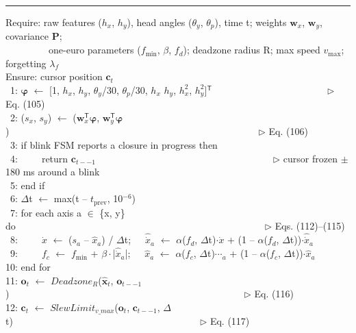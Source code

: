 \begin{algorithm}[htbp]
\caption{Gaze stabilisation and online recalibration (per frame)}
\label{alg:4}
\hrule\vspace{3pt}
{\ttfamily\scriptsize\raggedright
Require: raw features ($h_{x}$, $h_{y}$), head angles ($\theta_{y}$, $\theta_{p}$), time t; weights $\mathbf{w}_{x}$, $\mathbf{w}_{y}$, covariance $\mathbf{P}$; \\
~~~~~~~~~one-euro parameters ($f_{\mathrm{min}}$, $\beta$, $f_{d}$); deadzone radius R; max speed $v_{\mathrm{max}}$; forgetting $\lambda_{f}$ \\
Ensure: cursor position $\mathbf{c}_{t}$ \\
~1: $\boldsymbol{\varphi}$ $\leftarrow$ [1, $h_{x}$, $h_{y}$, $\theta_{y}$/30, $\theta_{p}$/30, $h_{x}$ $h_{y}$, $h_{x}^{2}$, $h_{y}^{2}$]$^{\mathsf{T}}$~~~~~~~~~~~~~~~~~~~~~~~~$\triangleright$ Eq. (105) \\
~2: ($s_{x}$, $s_{y}$) $\leftarrow$ ($\mathbf{w}_{x}^{\mathsf{T}}\boldsymbol{\varphi}$, $\mathbf{w}_{y}^{\mathsf{T}}\boldsymbol{\varphi}$)~~~~~~~~~~~~~~~~~~~~~~~~~~~~~~~~~~~~~~~~~~~~~~~~~~~~$\triangleright$ Eq. (106) \\
~3: if blink FSM reports a closure in progress then \\
~4:~~~~~return $\mathbf{c}_{t--1}$~~~~~~~~~~~~~~~~~~~~~~~~~~~~~~~~~~~~~$\triangleright$ cursor frozen $\pm$180 ms around a blink \\
~5: end if \\
~6: $\Delta$t $\leftarrow$ max(t -- $t_{\mathrm{prev}}$, 10$^{-6}$) \\
~7: for each axis a $\in$ \{x, y\} do~~~~~~~~~~~~~~~~~~~~~~~~~~~~~~~~~~~~~~~~~~~~~~~~~~~~$\triangleright$ Eqs. (112)--(115) \\
~8:~~~~~$\dot{x}$ $\leftarrow$ ($s_{a}$ -- $\hat{x}_{a}$) / $\Delta$t;~~~$\hat{\dot{x}}_{a}$ $\leftarrow$ $\alpha$($f_{d}$, $\Delta$t)$\cdot\dot{x}$ + (1 -- $\alpha$($f_{d}$, $\Delta$t))$\cdot\hat{\dot{x}}_{a}$ \\
~9:~~~~~$f_{c}$ $\leftarrow$ $f_{\mathrm{min}}$ + $\beta\cdot$|$\hat{\dot{x}}_{a}$|;~~~$\hat{x}_{a}$ $\leftarrow$ $\alpha$($f_{c}$, $\Delta$t)$\cdots_{a}$ + (1 -- $\alpha$($f_{c}$, $\Delta$t))$\cdot\hat{x}_{a}$ \\
10: end for \\
11: $\mathbf{o}_{t}$ $\leftarrow$ $Deadzone_{R}$($\hat{\mathbf{x}}_{t}$, $\mathbf{o}_{t--1}$)~~~~~~~~~~~~~~~~~~~~~~~~~~~~~~~~~~~~~~~~~~~~~~~~~$\triangleright$ Eq. (116) \\
12: $\mathbf{c}_{t}$ $\leftarrow$ $SlewLimit_{v\_max}$($\mathbf{o}_{t}$, $\mathbf{c}_{t--1}$, $\Delta$t)~~~~~~~~~~~~~~~~~~~~~~~~~~~~~~~~~~~~~~~$\triangleright$ Eq. (117) \\
}
\end{algorithm}
